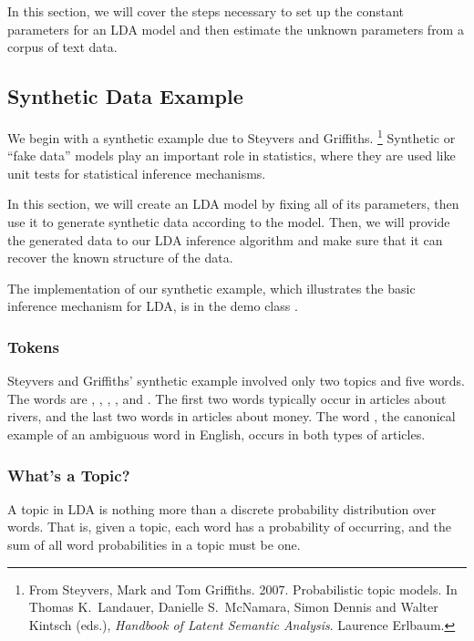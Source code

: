 In this section, we will cover the steps necessary to set up the
constant parameters for an LDA model and then estimate the unknown
parameters from a corpus of text data.

\subsection{Synthetic Data Example}

We begin with a synthetic example due to Steyvers and Griffiths.%
%
\footnote{From Steyvers, Mark and Tom Griffiths. 2007. Probabilistic
  topic models. In Thomas K.~Landauer, Danielle S.~McNamara, Simon
  Dennis and Walter Kintsch (eds.), {\it Handbook of Latent Semantic
    Analysis}. Laurence Erlbaum.}
%
Synthetic or ``fake data'' models play an important role in
statistics, where they are used like unit tests for statistical
inference mechanisms.  

In this section, we will create an LDA model by fixing all of its
parameters, then use it to generate synthetic data according to the
model.  Then, we will provide the generated data to our LDA
inference algorithm and make sure that it can recover the known
structure of the data.

The implementation of our synthetic example, which illustrates
the basic inference mechanism for LDA, is in the demo class
.

\subsubsection{Tokens}

Steyvers and Griffiths' synthetic example involved only two topics and
five words.  The words are ,
, , ,
and .  The first two words typically occur in
articles about rivers, and the last two words in articles about money.
The word , the canonical example of an ambiguous
word in English, occurs in both types of articles.  

\subsubsection{What's a Topic?}

A topic in LDA is nothing more than a discrete probability
distribution over words.  That is, given a topic, each word has a
probability of occurring, and the sum of all word probabilities in a
topic must be one.

